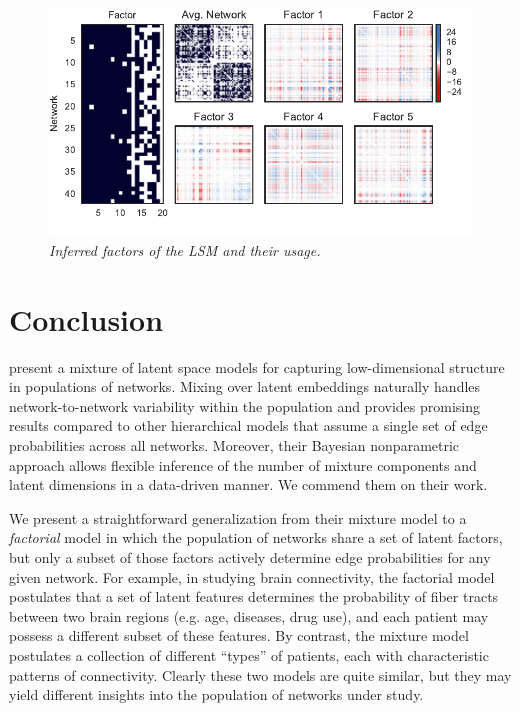 \begin{figure}[t]
  \includegraphics[width=\linewidth]{figures/factors.pdf}
  \vspace{-.4in}
\caption{\textit{Inferred factors of the LSM and their
  usage.}}
\label{fig:lls}
\end{figure}

\section{Conclusion}
\citet{durante2016nonparametric} present a mixture of latent space
models for capturing low-dimensional structure in populations of
networks.  Mixing over latent embeddings naturally handles network-to-network
variability within the population and provides promising results
compared to other hierarchical models that assume a single set of
edge probabilities across all networks.  Moreover, their Bayesian
nonparametric approach allows flexible inference of the number of
mixture components and latent dimensions in a data-driven manner.
We commend them on their work.

We present a straightforward generalization from their mixture
model to a \emph{factorial} model in which the population of
networks share a set of latent factors, but only a subset of those
factors actively determine edge probabilities for any given network.
For example, in studying brain connectivity, the factorial model postulates
that a set of latent features determines the probability of fiber
tracts between two brain regions (e.g. age, diseases, drug use), and
each patient may possess a different subset of these features. By contrast,
the mixture model postulates a collection of different ``types'' of
patients, each with characteristic patterns of connectivity.  Clearly
these two models are quite similar, but they may yield different
insights into the population of networks under study.















































